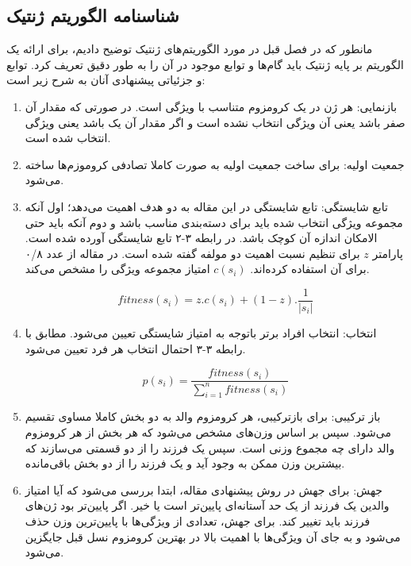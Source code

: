 \subsection{شناسنامه الگوریتم ژنتیک}
مانطور که در فصل قبل در مورد الگوریتم‌های ژنتیک توضیح دادیم، برای ارائه یک الگوریتم بر پایه ژنتیک باید گام‌ها و توابع موجود در آن را به طور دقیق تعریف کرد. توابع و جزئیاتی پیشنهادی آنان به شرح زیر است:
\begin{enumerate}
\item بازنمایی: هر ژن در یک کرومزوم متناسب با ويژگی است. در صورتی که مقدار آن صفر باشد یعنی آن ویژگی انتخاب نشده است و اگر مقدار آن یک باشد یعنی ویژگی انتخاب شده است.
\item جمعیت اولیه: برای ساخت جمعیت اولیه به صورت کاملا تصادفی کروموزم‌ها ساخته می‌شود.
\item تابع شایستگی: تابع شایستگی در این مقاله به دو هدف اهمیت می‌دهد؛ اول آنکه مجموعه ویژگی انتخاب شده باید برای دسته‌بندی مناسب باشد و دوم آنکه باید حتی الامکان اندازه آن کوچک باشد. در رابطه ۳-۲ تابع شایستگی آورده شده است. پارامتر
$z$
برای تنظیم نسبت اهمیت دو مولفه گفته شده است. در مقاله از عدد ۰/۸ برای آن استفاده کرده‌اند.
$c(s_i)$
امتیاز مجموعه ویژگی را مشخص می‌کند.

\begin{equation}
fitness(s_i) = z.c(s_i) + (1-z).\frac{1}{|s_i|}
\end{equation}

\item انتخاب: انتخاب افراد برتر باتوجه به امتیاز شایستگی تعیین می‌شود. مطابق با رابطه ۳-۳ احتمال انتخاب هر فرد تعیین می‌شود.

\begin{equation}
p(s_i) = \frac{fitness(s_i)}{\sum_{i=1}^n fitness(s_i)}
\end{equation}

\item باز ترکیبی: برای بازترکیبی، هر کرومزوم والد به دو بخش کاملا مساوی تقسیم می‌شود. سپس بر اساس وزن‌های  مشخص می‌شود که هر بخش از هر کرومزوم والد دارای چه مجموع وزنی است. سپس یک فرزند را از دو قسمتی می‌سازند که بیشترین وزن ممکن به وجود آید و یک فرزند را از دو بخش باقی‌مانده.
\item جهش: برای جهش در روش پیشنهادی مقاله، ابتدا بررسی می‌شود که آیا امتیاز والدین یک فرزند از یک حد آستانه‌ای پایین‌تر است یا خیر. اگر پایین‌تر بود ژن‌های فرزند باید تغییر کند. برای جهش، تعدادی از ویژگی‌ها با پایین‌ترین وزن حذف می‌شود و به جای آن ویژگی‌ها با اهمیت بالا در بهترین کرومزوم نسل قبل جایگزین می‌شود.
\end{enumerate}

